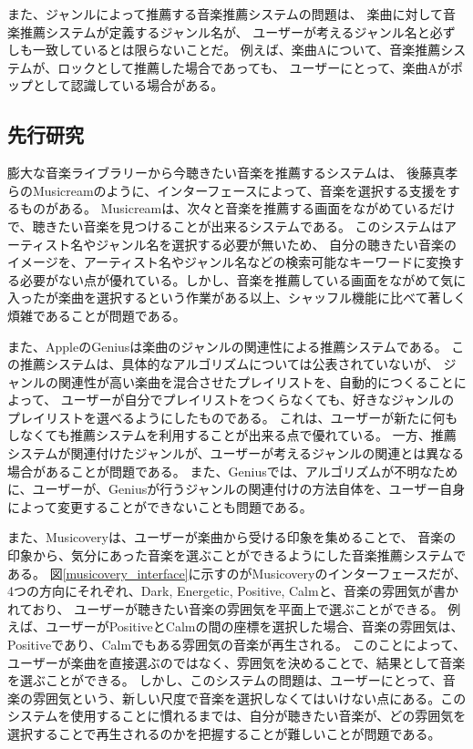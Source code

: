\documentclass[a4paper, 11pt, onecolumn, report]{jsarticle}
\begin{document}
また、ジャンルによって推薦する音楽推薦システムの問題は、
楽曲に対して音楽推薦システムが定義するジャンル名が、
ユーザーが考えるジャンル名と必ずしも一致しているとは限らないことだ。
例えば、楽曲Aについて、音楽推薦システムが、ロックとして推薦した場合であっても、
ユーザーにとって、楽曲Aがポップとして認識している場合がある。


\subsection{先行研究}
膨大な音楽ライブラリーから今聴きたい音楽を推薦するシステムは、
後藤真孝らのMusicreamのように、インターフェースによって、音楽を選択する支援をするものがある。
Musicreamは、次々と音楽を推薦する画面をながめているだけで、聴きたい音楽を見つけることが出来るシステムである。
このシステムはアーティスト名やジャンル名を選択する必要が無いため、
自分の聴きたい音楽のイメージを、アーティスト名やジャンル名などの検索可能なキーワードに変換する必要がない点が優れている。しかし、音楽を推薦している画面をながめて気に入ったが楽曲を選択するという作業がある以上、シャッフル機能に比べて著しく煩雑であることが問題である。

また、AppleのGeniusは楽曲のジャンルの関連性による推薦システムである。
この推薦システムは、具体的なアルゴリズムについては公表されていないが、
ジャンルの関連性が高い楽曲を混合させたプレイリストを、自動的につくることによって、
ユーザーが自分でプレイリストをつくらなくても、好きなジャンルのプレイリストを選べるようにしたものである。
これは、ユーザーが新たに何もしなくても推薦システムを利用することが出来る点で優れている。
一方、推薦システムが関連付けたジャンルが、ユーザーが考えるジャンルの関連とは異なる場合があることが問題である。
また、Geniusでは、アルゴリズムが不明なために、ユーザーが、Geniusが行うジャンルの関連付けの方法自体を、ユーザー自身によって変更することができないことも問題である。

また、Musicoveryは、ユーザーが楽曲から受ける印象を集めることで、
音楽の印象から、気分にあった音楽を選ぶことができるようにした音楽推薦システムである。
図\ref{musicovery_interface}に示すのがMusicoveryのインターフェースだが、
4つの方向にそれぞれ、Dark, Energetic, Positive, Calmと、音楽の雰囲気が書かれており、
ユーザーが聴きたい音楽の雰囲気を平面上で選ぶことができる。
例えば、ユーザーがPositiveとCalmの間の座標を選択した場合、音楽の雰囲気は、Positiveであり、Calmでもある雰囲気の音楽が再生される。
このことによって、ユーザーが楽曲を直接選ぶのではなく、雰囲気を決めることで、結果として音楽を選ぶことができる。
しかし、このシステムの問題は、ユーザーにとって、音楽の雰囲気という、新しい尺度で音楽を選択しなくてはいけない点にある。このシステムを使用することに慣れるまでは、自分が聴きたい音楽が、どの雰囲気を選択することで再生されるのかを把握することが難しいことが問題である。
\end{document}
